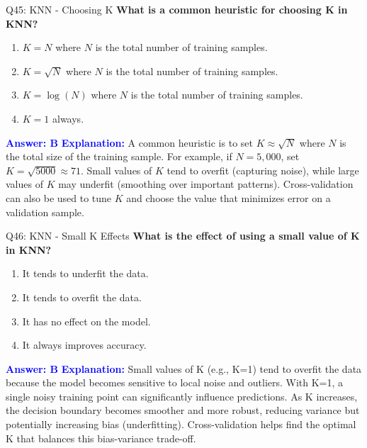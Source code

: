 \documentclass[8pt]{beamer}
\begin{document}
	\begin{frame}{Q45: KNN - Choosing K}
		\fontsize{6.5}{7.5}\selectfont
		\textbf{What is a common heuristic for choosing K in KNN?}
		\begin{enumerate}
			\item $K = N$ where $N$ is the total number of training samples.
			\item $K = \sqrt{N}$ where $N$ is the total number of training samples.
			\item $K = \log(N)$ where $N$ is the total number of training samples.
			\item $K = 1$ always.
		\end{enumerate}
		\vspace{0.1cm}
		\textcolor{blue}{\textbf{Answer: B}}
		\vspace{0.1cm}
		\textcolor{blue}{\textbf{Explanation:}} A common heuristic is to set $K \approx \sqrt{N}$ where $N$ is the total size of the training sample. For example, if $N = 5,000$, set $K = \sqrt{5000} \approx 71$. Small values of $K$ tend to overfit (capturing noise), while large values of $K$ may underfit (smoothing over important patterns). Cross-validation can also be used to tune $K$ and choose the value that minimizes error on a validation sample.
	\end{frame}
	
	\begin{frame}{Q46: KNN - Small K Effects}
		\fontsize{6.5}{7.5}\selectfont
		\textbf{What is the effect of using a small value of K in KNN?}
		\begin{enumerate}
			\item It tends to underfit the data.
			\item It tends to overfit the data.
			\item It has no effect on the model.
			\item It always improves accuracy.
		\end{enumerate}
		\vspace{0.1cm}
		\textcolor{blue}{\textbf{Answer: B}}
		\vspace{0.1cm}
		\textcolor{blue}{\textbf{Explanation:}} Small values of K (e.g., K=1) tend to overfit the data because the model becomes sensitive to local noise and outliers. With K=1, a single noisy training point can significantly influence predictions. As K increases, the decision boundary becomes smoother and more robust, reducing variance but potentially increasing bias (underfitting). Cross-validation helps find the optimal K that balances this bias-variance trade-off.
	\end{frame}
	
\end{document}
